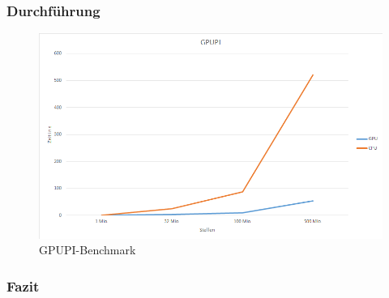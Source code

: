 \subsubsection{Durchführung}
\begin{figure}[!h]
	\begin{center}
		\includegraphics[width=17cm]{images/gpupi.png}
		\caption{GPUPI-Benchmark}
	\end{center}
\end{figure}
\newpage
\subsubsection{Fazit}